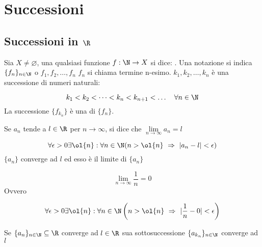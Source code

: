 \documentclass[../appunti.tex]{subfiles}
\begin{document}
\section{Successioni}
\subsection{Successioni in $\R$}
Sia $X \neq \varnothing$, una qualsiasi funzione $f: \N \to X$ si dice: 
. \newline
Una notazione si indica $ \{ f_n \}_{n \in \N} $ o $f_1, f_2, \dots , f_n $ \newline
$ f_n $ si chiama termine n-esimo. \newline
$ k_1, k_2, \dots , k_n $ è una successione di numeri naturali:

\begin{equation}
	k_1 < k_2 < \dots < k_n < k_{n+1} < \dots \quad \forall n \in \N
\end{equation}
La successione $ \{ f_{k_n} \} $ è una  di $ \{ f_n \} $.

\begin{defn}
Se $ a_n$ tende a $ l \in \R$ per $n \to \infty$, si dice che 
$ \lim \limits_{n \to \infty} a_n = l $

\begin{equation}
	\forall \epsilon > 0 \exists \ol{n}: \forall n \in \N
	( n > \ol{n}\ \Rightarrow\ | a_n - l | < \epsilon )
\end{equation}
$ \{ a_n \} $ converge ad $l$ ed esso è il limite di $ \{ a_n \} $ 
\end{defn}

\begin{esem}
\begin{equation}
	\lim \limits_{ n \to \infty} \frac{1}{n} = 0
\end{equation}
Ovvero

\begin{equation}
	\forall \epsilon > 0 \exists \ol{n}: \forall n \in \N
	\left( n > \ol{n}\ \Rightarrow\ | \frac{1}{n} - 0 | < \epsilon \right)
\end{equation}
\end{esem}



\begin{defn} 
Se $\{ a_n \}_{n \in \N} \subseteq \R$ converge ad $l \in \R$ 
sua sottosuccessione $ \{ a_{k_n} \}_{n \in \N}$ converge ad $ l $
\end{defn}
\end{document}
